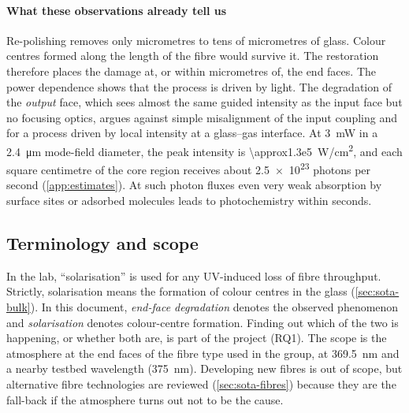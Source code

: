 \paragraph{What these observations already tell us} Re-polishing removes only micrometres to tens of
micrometres of glass. Colour centres formed along the length of the fibre would survive it. The
restoration therefore places the damage at, or within micrometres of, the end faces. The power dependence
shows that the process is driven by light. The degradation of the \emph{output} face, which sees almost the
same guided intensity as the input face but no focusing optics, argues against simple misalignment of the
input coupling and for a process driven by local intensity at a glass--gas interface. At \SI{3}{mW} in a
\SI{2.4}{\micro m} mode-field diameter, the peak intensity is \SI{\approx1.3e5}{W/cm^2}, and each
square centimetre of the core region receives about \num{2.5e23} photons per second (\cref{app:estimates}).
At such photon fluxes even very weak absorption by surface sites or adsorbed molecules leads to
photochemistry within seconds.

\subsection{Terminology and scope}
In the lab, ``solarisation'' is used for any UV-induced loss of fibre throughput. Strictly, solarisation
means the formation of colour centres in the glass (\cref{sec:sota-bulk}). In this document,
\emph{end-face degradation} denotes the observed phenomenon and \emph{solarisation} denotes colour-centre
formation. Finding out which of the two is happening, or whether both are, is part of the project (RQ1).
The scope is the atmosphere at the end faces of the fibre type used in the group, at \SI{369.5}{nm} and
a nearby testbed wavelength (\SI{375}{nm}). Developing new fibres is out of scope, but alternative fibre
technologies are reviewed (\cref{sec:sota-fibres}) because they are the fall-back if the atmosphere turns
out not to be the cause.
